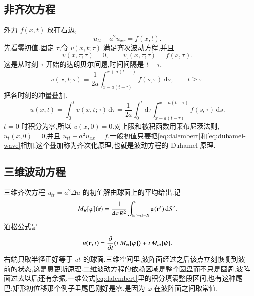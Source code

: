 \subsection{非齐次方程}
外力 $f(x,t)$ 放在右边,
\begin{equation}
  u_{tt}-a^2 u_{xx}=f(x,t).
\end{equation}
先看零初值.固定 $\tau$,令 $v(x,t;\tau)$ 满足齐次波动方程,并且
\begin{equation}
  v(x,\tau;\tau)=0, \qquad v_t(x,\tau;\tau)=f(x,\tau).
\end{equation}
这是从时刻 $\tau$ 开始的达朗贝尔问题,时间间隔是 $t-\tau$,
\begin{equation}
  v(x,t;\tau)
  =\frac{1}{2a}\int_{x-a(t-\tau)}^{x+a(t-\tau)} f(s,\tau)\,\mathrm{d}s,
  \qquad t\geq\tau.
\end{equation}
把各时刻的冲量叠加,
\begin{equation}
  u(x,t)=\int_0^t v(x,t;\tau)\,\mathrm{d}\tau
  =\frac{1}{2a}\int_0^t\mathrm{d}\tau
    \int_{x-a(t-\tau)}^{x+a(t-\tau)} f(s,\tau)\,\mathrm{d}s.
  \label{eq:duhamel-wave}
\end{equation}
$t=0$ 时积分为零,所以 $u(x,0)=0$.对上限和被积函数用莱布尼茨法则,$u_t(x,0)=0$,并且 $u_{tt}-a^2 u_{xx}=f$.一般初值只要把\eqref{eq:dalembert}和\eqref{eq:duhamel-wave}相加.这个叠加称为齐次化原理,也就是波动方程的 Duhamel 原理.

\subsection{三维波动方程}
三维齐次方程 $u_{tt}=a^2\Delta u$ 的初值解由球面上的平均给出.记
\begin{equation}
  M_R[\varphi]({\mathbf{r}})
  =\frac{1}{4\pi R^2}\int_{|{\mathbf{r}^{\prime}}-{\mathbf{r}}|=R}\varphi({\mathbf{r}^{\prime}})\,\mathrm{d}S'.
\end{equation}
泊松公式是
\begin{equation}
  u({\mathbf{r}},t)
  =\frac{\partial{}}{\partial{t}}\bigl(t\, M_{at}[\varphi]\bigr)
  +t\, M_{at}[\psi].
  \label{eq:poisson-wave}
\end{equation}
右端只取半径正好等于 $at$ 的球面.三维空间里,波阵面经过之后该点立刻恢复到波前的状态,这是惠更斯原理.二维波动方程的依赖区域是整个圆盘而不只是圆周,波阵面过去以后还有余振.一维公式\eqref{eq:dalembert}里的积分填满整段区间,也有这种尾巴;矩形初位移那个例子里尾巴刚好是零,是因为 $\varphi$ 在波阵面之间取常值.
